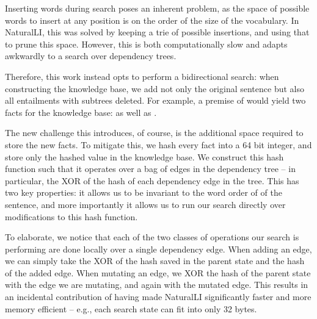 
%
%
Inserting words during search poses an inherent problem, 
  as the space of possible words to insert at any
  position is on the order of the size of the vocabulary.
In NaturalLI, this was solved by keeping a trie of possible insertions, and
  using that to prune this space.
However, this is both computationally slow and adapts awkwardly to a search over
  dependency trees.

Therefore, this work instead opts to perform a bidirectional search:
  when constructing the knowledge base, we add not only the original sentence but
  also all entailments with subtrees deleted.
For example, a premise of  would yield two facts
  for the knowledge base:  as well as .

The new challenge this introduces, of course, is the additional space required
  to store the new facts.
To mitigate this, we hash every fact into a 64 bit integer, and store only the hashed 
  value in the knowledge base.
We construct this hash function such that it operates over a bag of edges in the
  dependency tree -- in particular, the XOR of the hash of each dependency edge in
  the tree.
This has two key properties: it allows us to be invariant to the word order of
  of the sentence, and more importantly it allows us to run our search directly
  over modifications to this hash function.

To elaborate, we notice that each of the two classes of operations our search is
  performing are done locally over a single dependency edge.
When adding an edge, we can simply take the XOR of the hash saved in the 
  parent state and the hash of the added edge.
When mutating an edge, we XOR the hash of the parent state with the edge we are
  mutating, and again with the mutated edge.
This results in an incidental contribution of having made NaturalLI significantly
  faster and more memory efficient -- e.g., each search state can fit into
  only 32 bytes.

